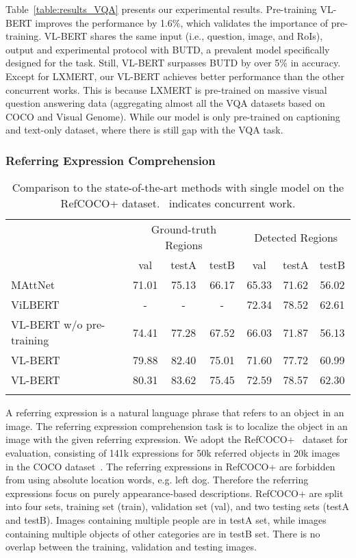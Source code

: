 \documentclass{article} \usepackage{iclr2020_conference,times}
\begin{document}
Table~\ref{table:results_VQA} presents our experimental results. Pre-training VL-BERT improves the performance by 1.6\%, which validates the importance of pre-training. VL-BERT shares the same input (i.e., question, image, and RoIs), output and experimental protocol with BUTD, a prevalent model specifically designed for the task. Still, VL-BERT surpasses BUTD by over 5\% in accuracy.  Except for LXMERT, our VL-BERT achieves better performance than the other concurrent works. This is because LXMERT is pre-trained on massive visual question answering data (aggregating almost all the VQA datasets based on COCO and Visual Genome). While our model is only pre-trained on captioning and text-only dataset, where there is still gap with the VQA task.


\subsubsection{Referring Expression Comprehension}

\begin{table}[ht]
\small
    \centering
\begin{tabular}{l|ccc|ccc}
\Xhline{1.0pt}
    \multirow{2}{*}{Model} & \multicolumn{3}{c|}{Ground-truth Regions} & \multicolumn{3}{c}{Detected Regions} \\
    \cline{2-7}
     & val & testA & testB & val & testA & testB\\
\hline
    MAttNet~\citep{yu2018mattnet}  & 71.01 & 75.13 & 66.17 & 65.33 & 71.62 & 56.02 \\
\hline
    ViLBERT~\citep{lu2019vilbert}  & -  & - & - & 72.34 & 78.52 & 62.61 \\
\hline
    VL-BERT w/o pre-training  & 74.41 & 77.28 & 67.52 & 66.03  & 71.87 & 56.13 \\
    VL-BERT  & 79.88 & 82.40 & 75.01 & 71.60 & 77.72 & 60.99 \\
    VL-BERT  & 80.31 & 83.62 & 75.45 & 72.59 & 78.57 & 62.30 \\
\Xhline{1.0pt}
\end{tabular}
\caption{Comparison to the state-of-the-art methods with single model on the RefCOCO+ dataset. \newline \dag ~indicates concurrent work.}
\label{table:results_REF}
\end{table}

A referring expression is a natural language phrase that refers to an object in an image. The referring expression comprehension task is to localize the object in an image with the given referring expression.
We adopt the RefCOCO+~\citep{kazemzadeh2014referitgame} dataset for evaluation, consisting of 141k expressions for 50k referred objects in 20k images in the COCO dataset~\citep{lin2014microsoft}.
The referring expressions in RefCOCO+ are forbidden from using absolute location words, e.g. left dog. Therefore the referring expressions focus on purely appearance-based descriptions. RefCOCO+ are split into four sets, training set (train), validation set (val), and two testing sets (testA and testB). Images containing multiple people are in testA set, while images containing multiple objects of other categories are in testB set. There is no overlap between the training, validation and testing images.
\end{document}
